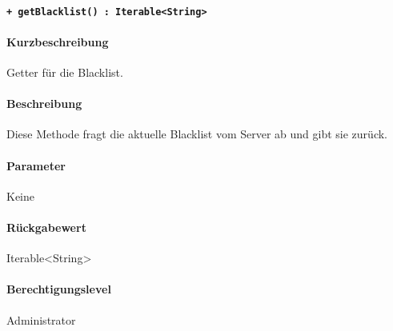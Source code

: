 \paragraph{\texttt{+ getBlacklist() : Iterable<String>}}%
\paragraph*{Kurzbeschreibung}
Getter für die Blacklist.
\paragraph*{Beschreibung}
Diese Methode fragt die aktuelle Blacklist vom Server ab und gibt sie zurück.
\paragraph*{Parameter}
Keine
\paragraph*{Rückgabewert}
Iterable<String>
\paragraph*{Berechtigungslevel}
Administrator